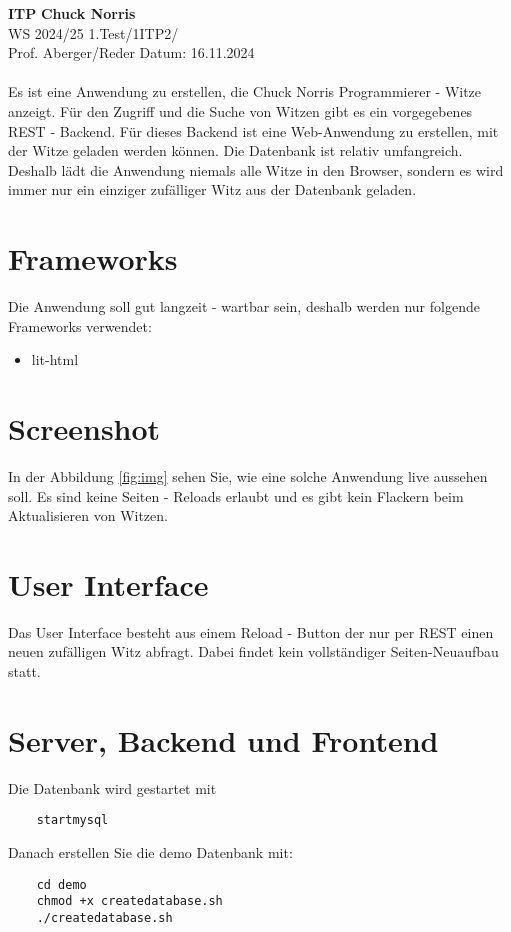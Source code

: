 \documentclass[a4paper, 11pt]{article}
\begin{document}
\noindent
\large\textbf{ITP} \hfill \textbf{Chuck Norris} \\
\normalsize WS 2024/25 \hfill 1.Test/1ITP2/\\
Prof. Aberger/Reder \hfill Datum: 16.11.2024\\
\\

\abstract{}
Es ist eine Anwendung zu erstellen, die Chuck Norris Programmierer - Witze anzeigt.
Für den Zugriff und die Suche von Witzen gibt es ein vorgegebenes REST - Backend.
Für dieses Backend ist eine Web-Anwendung zu erstellen, mit der Witze geladen werden können.
Die Datenbank ist relativ umfangreich. Deshalb lädt die Anwendung niemals alle Witze in den Browser,
sondern es wird immer nur ein einziger zufälliger Witz aus der Datenbank geladen.

\section{Frameworks}

Die Anwendung soll gut langzeit - wartbar sein, deshalb werden nur folgende Frameworks verwendet:
\begin{itemize}
	\item lit-html
\end{itemize}


\section{Screenshot}

In der Abbildung \ref{fig:img} sehen Sie, wie eine solche Anwendung live aussehen soll. Es sind keine Seiten - Reloads erlaubt und
es gibt kein Flackern beim Aktualisieren von Witzen.

\section{User Interface}
Das User Interface besteht aus einem Reload - Button der nur per REST einen neuen zufälligen Witz abfragt. Dabei findet kein vollständiger Seiten-Neuaufbau statt.

\section{Server, Backend und Frontend}
Die Datenbank wird gestartet mit

\begin{verbatim}
	startmysql
\end{verbatim}
Danach erstellen Sie die demo Datenbank mit:
\begin{verbatim}
	cd demo
	chmod +x createdatabase.sh
	./createdatabase.sh
\end{verbatim}
\end{document}
